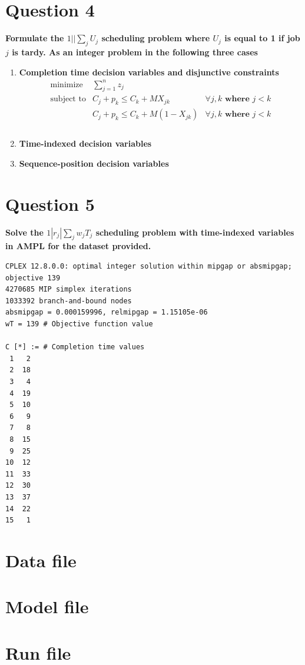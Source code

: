 \documentclass[a4paper, fleqn]{article}
\begin{document}
\section{Question 4}
\textbf{Formulate the $1||\sum_jU_j$ scheduling problem where $U_j$ is equal to 1 if job $j$ is tardy. As an integer problem in the following three cases}
\begin{enumerate}[label=(\alph{*})]
\item \textbf{Completion time decision variables and disjunctive constraints}\\
$$
\begin{array}{ccc}
\text{minimize}&\sum_{j=1}^nz_j&\\
\text{subject to}&C_j+p_k\leq C_k+MX_{jk}&\forall j,k\textbf{ where }j<k\\
&C_j+p_k\leq C_k+M(1-X_{jk})&\forall j,k\textbf{ where }j<k\\
&&\\
\end{array}
$$
\item \textbf{Time-indexed decision variables}\\

\item \textbf{Sequence-position decision variables}\\

\end{enumerate}

\section{Question 5}
\textbf{Solve the $1|r_j|\sum_jw_jT_j$ scheduling problem with time-indexed variables in AMPL for the dataset provided.}\\
\begin{lstlisting}[language=AMPL]
CPLEX 12.8.0.0: optimal integer solution within mipgap or absmipgap; objective 139
4270685 MIP simplex iterations
1033392 branch-and-bound nodes
absmipgap = 0.000159996, relmipgap = 1.15105e-06
wT = 139 # Objective function value

C [*] := # Completion time values
 1   2
 2  18
 3   4
 4  19
 5  10
 6   9
 7   8
 8  15
 9  25
10  12
11  33
12  30
13  37
14  22
15   1
\end{lstlisting}

\begin{appendix}
\section{Data file}

\section{Model file}

\section{Run file}

\end{appendix}
\end{document}
